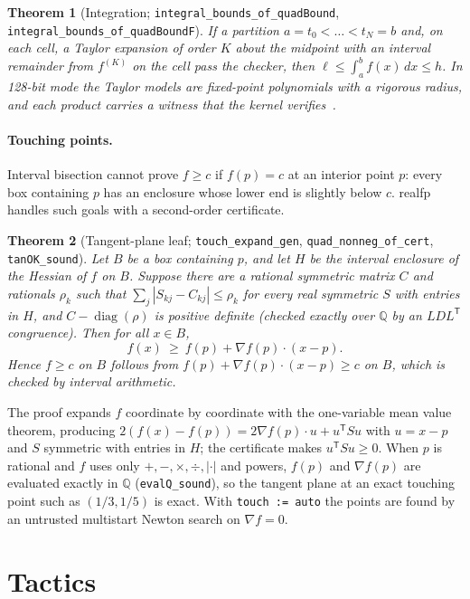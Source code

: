 \documentclass[11pt]{article}
\newtheorem{theorem}{Theorem}
\theoremstyle{definition}
\theoremstyle{remark}
\newcommand{\Q}{\mathbb{Q}}
\newcommand{\lean}[1]{\texttt{#1}}
\newcommand{\realfp}{\textsf{realfp}}
\begin{document}
\begin{theorem}[Integration; \lean{integral\_bounds\_of\_quadBound}, \lean{integral\_bounds\_of\_quadBoundF}]
If a partition $a=t_0<\dots<t_N=b$ and, on each cell, a Taylor
expansion of order $K$ about the midpoint with an interval remainder from
$f^{(K)}$ on the cell pass the checker, then
$\ell\le\int_a^b f(x)\,dx\le h$. In 128-bit mode the Taylor models are
fixed-point polynomials with a rigorous radius, and each product carries
a witness that the kernel verifies~\cite{makinoberz2003}.
\end{theorem}

\paragraph{Touching points.}
Interval bisection cannot prove $f\ge c$ if $f(p)=c$ at an interior point
$p$: every box containing $p$ has an enclosure whose lower end is slightly
below $c$. \realfp{} handles such goals with a second-order certificate.

\begin{theorem}[Tangent-plane leaf; \lean{touch\_expand\_gen}, \lean{quad\_nonneg\_of\_cert}, \lean{tanOK\_sound}]
\label{thm:touch}
Let $B$ be a box containing $p$, and let $H$ be the interval enclosure of
the Hessian of $f$ on $B$. Suppose there are a rational symmetric matrix $C$
and rationals $\rho_k$ such that $\sum_j|S_{kj}-C_{kj}|\le\rho_k$ for every
real symmetric $S$ with entries in $H$, and $C-\operatorname{diag}(\rho)$
is positive definite (checked exactly over $\Q$ by an $LDL^{\mathsf T}$
congruence). Then for all $x\in B$,
\[
  f(x)\ \ge\ f(p)+\nabla f(p)\cdot(x-p).
\]
Hence $f\ge c$ on $B$ follows from $f(p)+\nabla f(p)\cdot(x-p)\ge c$ on $B$,
which is checked by interval arithmetic.
\end{theorem}
The proof expands $f$ coordinate by coordinate with the one-variable mean
value theorem, producing $2(f(x)-f(p))=2\nabla f(p)\cdot u+u^{\mathsf T}Su$
with $u=x-p$ and $S$ symmetric with entries in $H$; the certificate makes
$u^{\mathsf T}Su\ge0$. When $p$ is rational and $f$ uses only
$+,-,\times,\div,|\cdot|$ and powers, $f(p)$ and $\nabla f(p)$ are
evaluated exactly in $\Q$ (\lean{evalQ\_sound}), so the tangent plane at
an exact touching point such as $(1/3,1/5)$ is exact. With
\lean{touch := auto} the points are found by an untrusted multistart Newton
search on $\nabla f=0$.

\section{Tactics}\label{sec:tactics}
\end{document}
